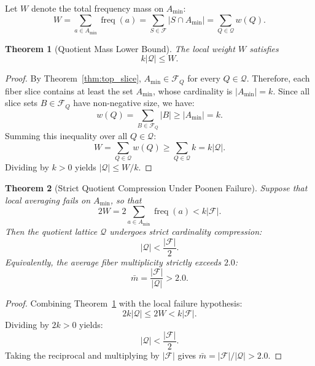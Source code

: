 \documentclass[11pt,a4paper]{article}
\theoremstyle{plain}
\newtheorem{theorem}{Theorem}[section]
\theoremstyle{definition}
\theoremstyle{remark}
\newcommand{\F}{\mathcal{F}}
\newcommand{\Q}{\mathcal{Q}}
\newcommand{\freq}{\operatorname{freq}}
\begin{document}
Let $W$ denote the total frequency mass on $A_{\min}$:
\begin{equation}
W = \sum_{a \in A_{\min}} \freq(a) = \sum_{S \in \F} |S \cap A_{\min}| = \sum_{Q \in \Q} w(Q).
\end{equation}

\begin{theorem}[Quotient Mass Lower Bound]\label{thm:q_mass_bound}
The local weight $W$ satisfies
\begin{equation}
k |\Q| \le W.
\end{equation}
\end{theorem}
\begin{proof}
By Theorem~\ref{thm:top_slice}, $A_{\min} \in \F_Q$ for every $Q \in \Q$. Therefore, each fiber slice contains at least the set $A_{\min}$, whose cardinality is $|A_{\min}| = k$. Since all slice sets $B \in \F_Q$ have non-negative size, we have:
\begin{equation}
w(Q) = \sum_{B \in \F_Q} |B| \ge |A_{\min}| = k.
\end{equation}
Summing this inequality over all $Q \in \Q$:
\begin{equation}
W = \sum_{Q \in \Q} w(Q) \ge \sum_{Q \in \Q} k = k |\Q|.
\end{equation}
Dividing by $k > 0$ yields $|\Q| \le W / k$.
\end{proof}

\begin{theorem}[Strict Quotient Compression Under Poonen Failure]\label{thm:strict_compression}
Suppose that local averaging fails on $A_{\min}$, so that
\begin{equation}
2 W = 2 \sum_{a \in A_{\min}} \freq(a) < k |\F|.
\end{equation}
Then the quotient lattice $\Q$ undergoes strict cardinality compression:
\begin{equation}
|\Q| < \frac{|\F|}{2}.
\end{equation}
Equivalently, the average fiber multiplicity strictly exceeds $2.0$:
\begin{equation}
\bar{m} = \frac{|\F|}{|\Q|} > 2.0.
\end{equation}
\end{theorem}
\begin{proof}
Combining Theorem~\ref{thm:q_mass_bound} with the local failure hypothesis:
\begin{equation}
2 k |\Q| \le 2 W < k |\F|.
\end{equation}
Dividing by $2k > 0$ yields:
\begin{equation}
|\Q| < \frac{|\F|}{2}.
\end{equation}
Taking the reciprocal and multiplying by $|\F|$ gives $\bar{m} = |\F| / |\Q| > 2.0$.
\end{proof}
\end{document}
